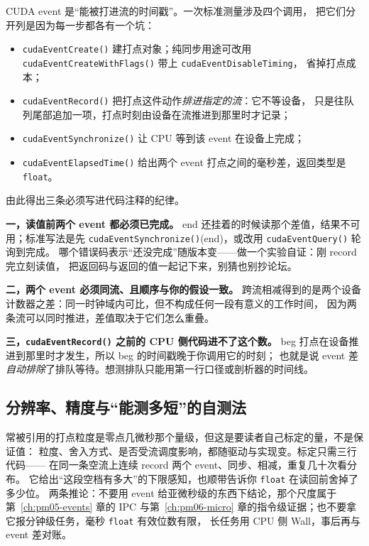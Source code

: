 \documentclass[12pt,a4paper,fontset=fandol]{ctexbook}
\newcommand{\Fn}[1]{\texttt{#1()}}
\newcommand{\Tp}[1]{\texttt{#1}}
\newcommand{\Bk}{\discretionary{}{}{}}
\newcommand{\Lang}[1]{\textsf{#1}}
\newcommand{\MWall}{\Lang{Wall}}
\newcommand{\Mx}[1]{\textsf{#1}}
\begin{document}
CUDA event 是``能被打进流的时间戳''。一次标准测量涉及四个调用，
把它们分开列是因为每一步都各有一个坑：

\begin{itemize}
  \item \Fn{cudaEvent{\Bk}Create} 建打点对象；纯同步用途可改用
        \Fn{cudaEvent{\Bk}Create{\Bk}WithFlags} 带上 \Tp{cudaEvent{\Bk}Disable{\Bk}Timing}，
        省掉打点成本；
  \item \Fn{cudaEvent{\Bk}Record} 把打点这件动作\emph{排进指定的流}：它不等设备，
        只是往队列尾部追加一项，打点时刻由设备在流推进到那里时才记录；
  \item \Fn{cudaEvent{\Bk}Synchronize} 让 CPU 等到该 event 在设备上完成；
  \item \Fn{cudaEvent{\Bk}ElapsedTime} 给出两个 event 打点之间的毫秒差，返回类型是 \Tp{float}。
\end{itemize}

由此得出三条必须写进代码注释的纪律。

\textbf{一，读值前两个 event 都必须已完成。}
end 还挂着的时候读那个差值，结果不可用；标准写法是先
\Fn{cudaEvent{\Bk}Synchronize}(end)，或改用 \Fn{cudaEvent{\Bk}Query} 轮询到完成。
哪个错误码表示``还没完成''随版本变——做一个实验自证：刚 record 完立刻读值，
把返回码与返回的值一起记下来，别猜也别抄论坛。

\textbf{二，两个 event 必须同流、且顺序与你的假设一致。}
跨流相减得到的是两个设备计数器之差：同一时钟域内可比，但不构成任何一段有意义的工作时间，
因为两条流可以同时推进，差值取决于它们怎么重叠。

\textbf{三，\Fn{cudaEvent{\Bk}Record} 之前的 CPU 侧代码进不了这个数。}
beg 打点在设备推进到那里时才发生，所以 beg 的时间戳晚于你调用它的时刻；
也就是说 event 差\emph{自动排除}了排队等待。想测排队只能用第一行口径或剖析器的时间线。

\subsection{分辨率、精度与``能测多短''的自测法}
\label{sub:pm11-resolution}

常被引用的打点粒度是零点几微秒那个量级，但这是要读者自己标定的量，不是保证值：
粒度、舍入方式、是否受流调度影响，都随驱动与实现变。标定只需三行代码——
在同一条空流上连续 record 两个 event、同步、相减，重复几十次看分布。
它给出``这段空档有多大''的下限感知，也顺带告诉你 \Tp{float} 在读回前舍掉了多少位。
两条推论：不要用 event 给亚微秒级的东西下结论，那个尺度属于第~\ref{ch:pm05-events} 章的 \Mx{IPC}
与第~\ref{ch:pm06-micro} 章的指令级证据；也不要拿它报分钟级任务，毫秒 \Tp{float} 有效位数有限，
长任务用 CPU 侧 \MWall{}，事后再与 event 差对账。
\end{document}
